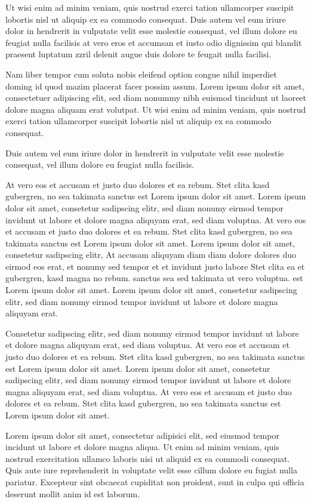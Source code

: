 \documentclass[twoside,a4paper]{article}
\begin{document}
Ut wisi enim ad minim veniam, quis nostrud exerci tation ullamcorper suscipit lobortis nisl ut aliquip ex ea commodo consequat. Duis autem vel eum iriure dolor in hendrerit in vulputate velit esse molestie consequat, vel illum dolore eu feugiat nulla facilisis at vero eros et accumsan et iusto odio dignissim qui blandit praesent luptatum zzril delenit augue duis dolore te feugait nulla facilisi.

Nam liber tempor cum soluta nobis eleifend option congue nihil imperdiet doming id quod mazim placerat facer possim assum. Lorem ipsum dolor sit amet, consectetuer adipiscing elit, sed diam nonummy nibh euismod tincidunt ut laoreet dolore magna aliquam erat volutpat. Ut wisi enim ad minim veniam, quis nostrud exerci tation ullamcorper suscipit lobortis nisl ut aliquip ex ea commodo consequat.

Duis autem vel eum iriure dolor in hendrerit in vulputate velit esse molestie consequat, vel illum dolore eu feugiat nulla facilisis.

At vero eos et accusam et justo duo dolores et ea rebum. Stet clita kasd gubergren, no sea takimata sanctus est Lorem ipsum dolor sit amet. Lorem ipsum dolor sit amet, consetetur sadipscing elitr, sed diam nonumy eirmod tempor invidunt ut labore et dolore magna aliquyam erat, sed diam voluptua. At vero eos et accusam et justo duo dolores et ea rebum. Stet clita kasd gubergren, no sea takimata sanctus est Lorem ipsum dolor sit amet. Lorem ipsum dolor sit amet, consetetur sadipscing elitr, At accusam aliquyam diam diam dolore dolores duo eirmod eos erat, et nonumy sed tempor et et invidunt justo labore Stet clita ea et gubergren, kasd magna no rebum. sanctus sea sed takimata ut vero voluptua. est Lorem ipsum dolor sit amet. Lorem ipsum dolor sit amet, consetetur sadipscing elitr, sed diam nonumy eirmod tempor invidunt ut labore et dolore magna aliquyam erat.

Consetetur sadipscing elitr, sed diam nonumy eirmod tempor invidunt ut labore et dolore magna aliquyam erat, sed diam voluptua. At vero eos et accusam et justo duo dolores et ea rebum. Stet clita kasd gubergren, no sea takimata sanctus est Lorem ipsum dolor sit amet. Lorem ipsum dolor sit amet, consetetur sadipscing elitr, sed diam nonumy eirmod tempor invidunt ut labore et dolore magna aliquyam erat, sed diam voluptua. At vero eos et accusam et justo duo dolores et ea rebum. Stet clita kasd gubergren, no sea takimata sanctus est Lorem ipsum dolor sit amet. 

Lorem ipsum dolor sit amet, consectetur adipisici elit, sed eiusmod tempor incidunt ut labore et dolore magna aliqua. Ut enim ad minim veniam, quis nostrud exercitation ullamco laboris nisi ut aliquid ex ea commodi consequat. Quis aute iure reprehenderit in voluptate velit esse cillum dolore eu fugiat nulla pariatur. Excepteur sint obcaecat cupiditat non proident, sunt in culpa qui officia deserunt mollit anim id est laborum.
\end{document}
